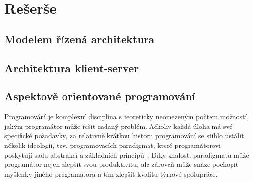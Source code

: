 \usepackage[T1]{fontenc}
\usepackage[utf8]{inputenc}


\chapter{Rešerše}\label{ch:reserse}

\section{Modelem řízená architektura}


\section{Architektura klient-server}\label{sec:client-server}


\section{Aspektově orientované programování}

Programování je komplexní disciplína s teoreticky
neomezeným počtem možností, jakým programátor může
řešit zadaný problém. Ačkoliv každá úloha má své specifické
požadavky, za relativně krátkou historii programování se
stihlo ustálit několik ideologií, tzv. programovacích
paradigmat, které programátorovi poskytují sadu abstrakcí
a základních principů~\cite{van2009programming}.
Díky znalosti paradigmatu může programátor nejen zlepšit
svou produktivitu, ale zároveň může snáze pochopit myšlenky
jiného programátora a tím zlepšit kvalitu týmové spolupráce.


